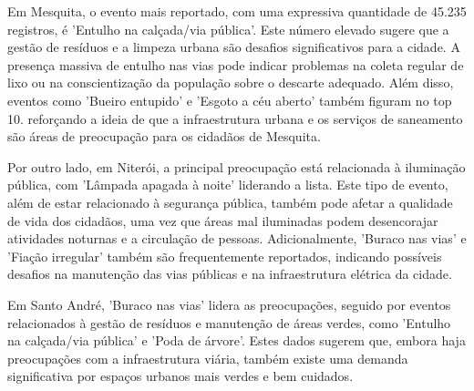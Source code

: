 Em Mesquita, o evento mais reportado, com uma expressiva quantidade de 45.235 registros, é 'Entulho na calçada/via pública'. Este número elevado sugere que a gestão de resíduos e a limpeza urbana são desafios significativos para a cidade. A presença massiva de entulho nas vias pode indicar problemas na coleta regular de lixo ou na conscientização da população sobre o descarte adequado. Além disso, eventos como 'Bueiro entupido' e 'Esgoto a céu aberto' também figuram no top 10. reforçando a ideia de que a infraestrutura urbana e os serviços de saneamento são áreas de preocupação para os cidadãos de Mesquita.

Por outro lado, em Niterói, a principal preocupação está relacionada à iluminação pública, com 'Lâmpada apagada à noite' liderando a lista. Este tipo de evento, além de estar relacionado à segurança pública, também pode afetar a qualidade de vida dos cidadãos, uma vez que áreas mal iluminadas podem desencorajar atividades noturnas e a circulação de pessoas. Adicionalmente, 'Buraco nas vias' e 'Fiação irregular' também são frequentemente reportados, indicando possíveis desafios na manutenção das vias públicas e na infraestrutura elétrica da cidade.

Em Santo André, 'Buraco nas vias' lidera as preocupações, seguido por eventos relacionados à gestão de resíduos e manutenção de áreas verdes, como 'Entulho na calçada/via pública' e 'Poda de árvore'. Estes dados sugerem que, embora haja preocupações com a infraestrutura viária, também existe uma demanda significativa por espaços urbanos mais verdes e bem cuidados.

